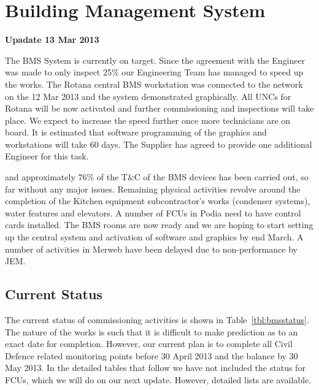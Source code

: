 \chapter{Building Management System}
\label{bms}

\begin{update}
\centerline{\textbf{Upadate 13 Mar 2013}}

The BMS System is currently on target. Since the agreement with the Engineer was made to only
inspect 25\% our Engineering Team has managed to speed up the works. The Rotana central
BMS workstation was connected to the network on the 12 Mar 2013 and the system demonstrated
graphically. All UNCs for Rotana will be now activated and further commissioning and inspections will
take place. We expect to increase the speed further once more technicians are on board. It is estimated
that software programming of the graphics and workstations will take 60 days. The Supplier has 
agreed to provide one additional Engineer for this task.
\end{update}

 and approximately 76\% of the T\&C of the \ac{BMS} devices has been carried out, so far without any major issues. Remaining physical activities revolve around the
completion of the Kitchen equipment subcontractor's works (condenser systems), water features and elevators. A number of \acp{FCU} in Podia need to have control cards installed. The BMS rooms are now ready and we are hoping to start setting up the central system and activation of software and graphics by end March. A number of activities in Merweb have been delayed due to non-performance by JEM.

\section{Current Status}

The current status of commissioning activities is shown in
Table~\ref{tbl:bmsstatus}. The nature of the works is such
that it is difficult to make prediction as to an exact date
for completion. However, our current plan is to complete all Civil Defence related monitoring points before 30 April 2013 and the balance by 30 May 2013. In the detailed tables that follow we have not included the status for FCUs, which we will do on our next update. However, detailed lists are available.


